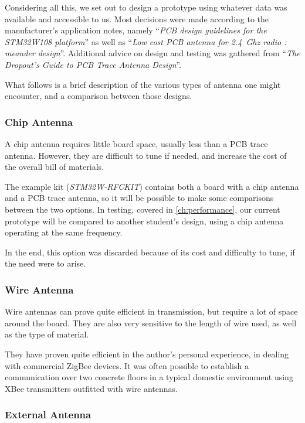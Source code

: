 Considering all this, we set out to design a prototype using whatever data was
available and accessible to us. Most decisions were made according to the
manufacturer's application notes, namely ``\emph{PCB design guidelines for the
STM32W108 platform}''\citep{AM3206} as well as ``\emph{Low cost PCB antenna for
\SI{2.4}{Ghz} radio : meander design}''\citep{AN3359}. Additional advice on
design and testing was gathered from ``\emph{The Dropout's Guide to PCB Trace
Antenna Design}''\citep{DropoutGuide}. 

What follows is a brief description of the various types of antenna one might
encounter, and a comparison between those designs. 

\subsubsection{Chip Antenna}


A chip antenna requires little board space, usually less than a PCB trace
antenna. However, they are difficult to tune if needed, and increase the cost of
the overall bill of materials.

The example kit (\emph{STM32W-RFCKIT}) contains both a board with a chip antenna
and a PCB trace antenna, so it will be possible to make some comparisons between
the two options. In testing, covered in \autoref{ch:performance}, our current
prototype will be compared to another student's design, using a chip antenna
operating at the same frequency.

In the end, this option was discarded because of its cost and difficulty to
tune, if the need were to arise.

\subsubsection{Wire Antenna}

Wire antennas can prove quite efficient in transmission, but require a lot of
space around the board. They are also very sensitive to the length of wire
used, as well as the type of material. 

They have proven quite efficient in the author's personal experience, in dealing
with commercial ZigBee devices. It was often possible to establish
a communication over two concrete floors in a typical domestic environment using
XBee transmitters outfitted with wire antennas.

\subsubsection{External Antenna}

